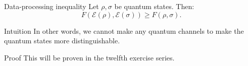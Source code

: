 \documentclass[a4paper]{article}
\begin{document}
\begin{parag}{Data-processing inequality}
    Let $\rho, \sigma$ be quantum states. Then: 
    \[F\left(\mathcal{E}\left(\rho\right), \mathcal{E}\left(\sigma\right)\right) \geq F\left(\rho, \sigma\right).\]
     
    \begin{subparag}{Intuition}
        In other words, we cannot make any quantum channels to make the quantum states more distinguishable. 
    \end{subparag}

    \begin{subparag}{Proof}
        This will be proven in the twelfth exercise series.
    \end{subparag}
\end{parag}
\end{document}
